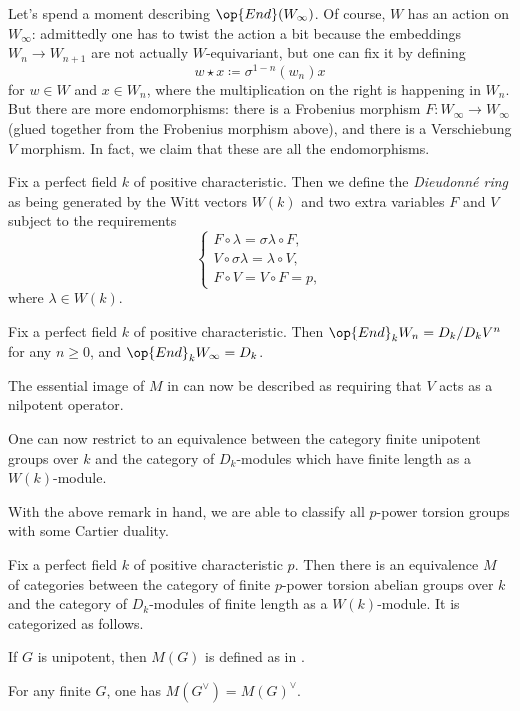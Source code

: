 \documentclass[../notes.tex]{subfiles}
\begin{document}
Let's spend a moment describing $\op{End}(W_\infty)$. Of course, $W$ has an action on $W_\infty$: admittedly one has to twist the action a bit because the embeddings $W_n\to W_{n+1}$ are not actually $W$-equivariant, but one can fix it by defining
\[w\star x\coloneqq \sigma^{1-n}(w_n)x\]
for $w\in W$ and $x\in W_n$, where the multiplication on the right is happening in $W_n$. But there are more endomorphisms: there is a Frobenius morphism $F\colon W_\infty\to W_\infty$ (glued together from the Frobenius morphism above), and there is a Verschiebung $V$ morphism. In fact, we claim that these are all the endomorphisms.
\begin{definition}
	Fix a perfect field $k$ of positive characteristic. Then we define the \textit{Dieudonn\'e ring} as being generated by the Witt vectors $W(k)$ and two extra variables $F$ and $V$ subject to the requirements
	\[\begin{cases}
		F\circ\lambda = \sigma\lambda\circ F, \\
		V\circ\sigma\lambda = \lambda\circ V, \\
		F\circ V=V\circ F=p,
	\end{cases}\]
	where $\lambda\in W(k)$.
\end{definition}
\begin{lemma}
	Fix a perfect field $k$ of positive characteristic. Then $\op{End}_kW_n=D_k/D_kV^n$ for any $n\ge0$, and $\op{End}_kW_\infty=D_k$.
\end{lemma}
\begin{remark}
	The essential image of $M$ in  can now be described as requiring that $V$ acts as a nilpotent operator.
\end{remark}
\begin{remark}
	One can now restrict  to an equivalence between the category finite unipotent groups over $k$ and the category of $D_k$-modules which have finite length as a $W(k)$-module.
\end{remark}
With the above remark in hand, we are able to classify all $p$-power torsion groups with some Cartier duality.
\begin{theorem}
	Fix a perfect field $k$ of positive characteristic $p$. Then there is an equivalence $M$ of categories between the category of finite $p$-power torsion abelian groups over $k$ and the category of $D_k$-modules of finite length as a $W(k)$-module. It is categorized as follows.
	\begin{listroman}
		\item If $G$ is unipotent, then $M(G)$ is defined as in .
		\item For any finite $G$, one has $M(G^\lor)=M(G)^\lor$.
	\end{listroman}
\end{theorem}
\end{document}
